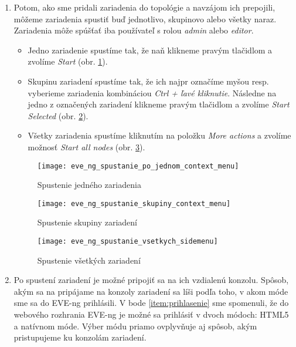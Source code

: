 \begin{enumerate}[noitemsep]
    \item Potom, ako sme pridali zariadenia do topológie a navzájom ich prepojili, môžeme zariadenia spustiť buď jednotlivo, skupinovo alebo všetky naraz. Zariadenia môže spúšťať iba používateľ s rolou \emph{admin} alebo \emph{editor}.

    \begin{itemize}[noitemsep]
        \item Jedno zariadenie spustíme tak, že naň klikneme pravým tlačidlom a zvolíme \emph{Start} (obr. \ref{obr:eve_ng_spustanie_po_jednom_context_menu}).
        \item Skupinu zariadení spustíme tak, že ich najpr označíme myšou resp. vyberieme zariadenia kombináciou \emph{Ctrl + ľavé kliknutie}. Následne na jedno z označených zariadení klikneme pravým tlačidlom a zvolíme \emph{Start Selected} (obr. \ref{obr:eve_ng_spustanie_skupiny_context_menu}).
        \item Všetky zariadenia spustíme kliknutím na položku \emph{More actions} a zvolíme možnosť \emph{Start all nodes} (obr. \ref{obr:eve_ng_spustanie_vsetkych_context_menu}).
    \end{itemize}

\begin{figure}
    \centering
    \texttt{[image: eve\_ng\_spustanie\_po\_jednom\_context\_menu]}
    \caption{Spustenie jedného zariadenia}
    \label{obr:eve_ng_spustanie_po_jednom_context_menu}
\end{figure}

\begin{figure}
    \centering
    \texttt{[image: eve\_ng\_spustanie\_skupiny\_context\_menu]}
    \caption{Spustenie skupiny zariadení}
    \label{obr:eve_ng_spustanie_skupiny_context_menu}
\end{figure}

\begin{figure}
    \centering
    \texttt{[image: eve\_ng\_spustanie\_vsetkych\_sidemenu]}
    \caption{Spustenie všetkých zariadení}
    \label{obr:eve_ng_spustanie_vsetkych_context_menu}
\end{figure}
      
    \item \label{item:vzdialeny_pristup} Po spustení zariadení je možné pripojiť sa na ich vzdialenú konzolu. Spôsob, akým sa na pripájame na konzoly zariadení sa líši podľa toho, v akom móde sme sa do EVE-ng prihlásili. V bode \ref{item:prihlasenie} sme spomenuli, že do webového rozhrania EVE-ng je možné sa prihlásiť v dvoch módoch: HTML5 a natívnom móde. Výber módu priamo ovplyvňuje aj spôsob, akým pristupujeme ku konzolám zariadení.
    

\end{enumerate}
